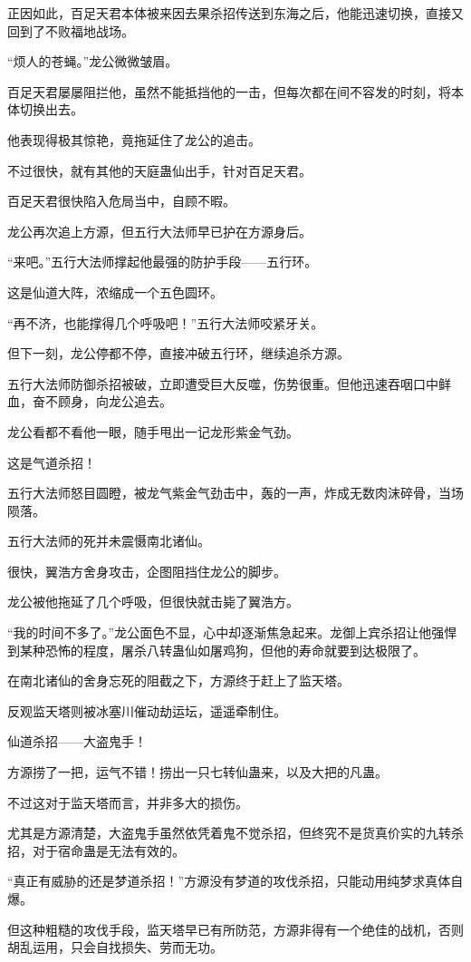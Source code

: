 \begin{this_body}
正因如此，百足天君本体被来因去果杀招传送到东海之后，他能迅速切换，直接又回到了不败福地战场。

“烦人的苍蝇。”龙公微微皱眉。

百足天君屡屡阻拦他，虽然不能抵挡他的一击，但每次都在间不容发的时刻，将本体切换出去。

他表现得极其惊艳，竟拖延住了龙公的追击。

不过很快，就有其他的天庭蛊仙出手，针对百足天君。

百足天君很快陷入危局当中，自顾不暇。

龙公再次追上方源，但五行大法师早已护在方源身后。

“来吧。”五行大法师撑起他最强的防护手段——五行环。

这是仙道大阵，浓缩成一个五色圆环。

“再不济，也能撑得几个呼吸吧！”五行大法师咬紧牙关。

但下一刻，龙公停都不停，直接冲破五行环，继续追杀方源。

五行大法师防御杀招被破，立即遭受巨大反噬，伤势很重。但他迅速吞咽口中鲜血，奋不顾身，向龙公追去。

龙公看都不看他一眼，随手甩出一记龙形紫金气劲。

这是气道杀招！

五行大法师怒目圆瞪，被龙气紫金气劲击中，轰的一声，炸成无数肉沫碎骨，当场陨落。

五行大法师的死并未震慑南北诸仙。

很快，翼浩方舍身攻击，企图阻挡住龙公的脚步。

龙公被他拖延了几个呼吸，但很快就击毙了翼浩方。

“我的时间不多了。”龙公面色不显，心中却逐渐焦急起来。龙御上宾杀招让他强悍到某种恐怖的程度，屠杀八转蛊仙如屠鸡狗，但他的寿命就要到达极限了。

在南北诸仙的舍身忘死的阻截之下，方源终于赶上了监天塔。

反观监天塔则被冰塞川催动劫运坛，遥遥牵制住。

仙道杀招——大盗鬼手！

方源捞了一把，运气不错！捞出一只七转仙蛊来，以及大把的凡蛊。

不过这对于监天塔而言，并非多大的损伤。

尤其是方源清楚，大盗鬼手虽然依凭着鬼不觉杀招，但终究不是货真价实的九转杀招，对于宿命蛊是无法有效的。

“真正有威胁的还是梦道杀招！”方源没有梦道的攻伐杀招，只能动用纯梦求真体自爆。

但这种粗糙的攻伐手段，监天塔早已有所防范，方源非得有一个绝佳的战机，否则胡乱运用，只会自找损失、劳而无功。


\end{this_body}
